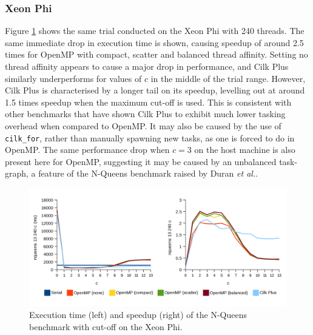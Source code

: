 \documentclass{report}
\begin{document}
\subsubsection{Xeon Phi}
Figure \ref{Fig:nqueenscutoffmic} shows the same trial conducted on the Xeon Phi with 240 threads. The same immediate drop in execution time is shown, causing speedup of around 2.5 times for OpenMP with compact, scatter and balanced thread affinity. Setting no thread affinity appears to cause a major drop in performance, and Cilk Plus similarly underperforms for values of \(c\) in the middle of the trial range. However, Cilk Plus is characterised by a longer tail on its speedup, levelling out at around 1.5 times speedup when the maximum cut-off is used. This is consistent with other benchmarks that have shown Cilk Plus to exhibit much lower tasking overhead when compared to OpenMP. It may also be caused by the use of \verb!cilk_for!, rather than manually spawning new tasks, as one is forced to do in OpenMP. The same performance drop when \(c=3\) on the host machine is also present here for OpenMP, suggesting it may be caused by an unbalanced task-graph, a feature of the N-Queens benchmark raised by Duran \textit{et al.}\cite{Duran09}.
\noindent
\begin{figure}[t!]
	\includegraphics[width=\linewidth]{../../charts/mic/nqueens_cutoff}
	\caption{Execution time (left) and speedup (right) of the N-Queens benchmark with cut-off on the Xeon Phi.}
	\label{Fig:nqueenscutoffmic}
\end{figure}
\end{document}
